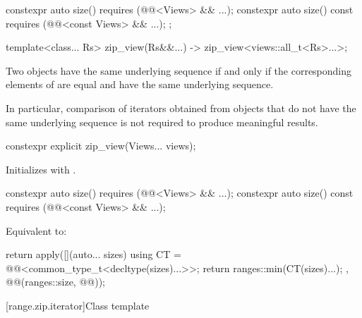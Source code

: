\begin{codeblock}
{{    constexpr auto size() requires (@@<Views> && ...);
    constexpr auto size() const requires (@@<const Views> && ...);
  };

  template<class... Rs>
    zip_view(Rs&&...) -> zip_view<views::all_t<Rs>...>;
}
\end{codeblock}

\pnum
Two  objects have the same underlying sequence if and only if
the corresponding elements of  are equal
and have the same underlying sequence.
\begin{note}
In particular, comparison of iterators obtained from  objects
that do not have the same underlying sequence
is not required to produce meaningful results.
\end{note}

%
\begin{itemdecl}
constexpr explicit zip_view(Views... views);
\end{itemdecl}

\begin{itemdescr}
\pnum
\effects
Initializes  with .
\end{itemdescr}

%
\begin{itemdecl}
constexpr auto size() requires (@@<Views> && ...);
constexpr auto size() const requires (@@<const Views> && ...);
\end{itemdecl}

\begin{itemdescr}
\pnum
\effects
Equivalent to:
\begin{codeblock}
return apply([](auto... sizes) {
  using CT = @@<common_type_t<decltype(sizes)...>>;
  return ranges::min({CT(sizes)...});
}, @@(ranges::size, @@));
\end{codeblock}
\end{itemdescr}

[range.zip.iterator]{Class template }

